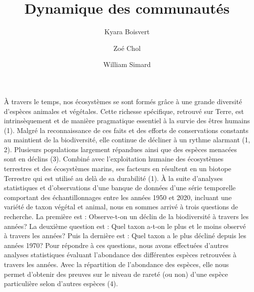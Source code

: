 \documentclass[9pt,twocolumn,twoside,]{pnas-new}
\title{Dynamique des communautés}
\author[a]{Kyara Boisvert}
\author[a]{Zoé Chol}
\author[a]{William Simard}
\affil[a]{Université de Sherbrooke, Département d'écologie, 2500
Boulevard de l'Université, Sherbrooke, Québec, J1N 3C6}
\begin{document}
\verticaladjustment{-2pt}



\maketitle
\thispagestyle{firststyle}


\acknow{}

À travers le temps, nos écosystèmes se sont formés grâce à une grande
diversité d'espèces animales et végétales. Cette richesse spécifique,
retrouvé sur Terre, est intrinsèquement et de manière pragmatique
essentiel à la survie des êtres humains (1). Malgré la reconnaissance de
ces faits et des efforts de conservations constants au maintient de la
biodiversité, elle continue de décliner à un rythme alarmant (1, 2).
Plusieurs populations largement répandues ainsi que des espèces menacées
sont en déclins (3). Combiné avec l'exploitation humaine des écosystèmes
terrestres et des écosystèmes marins, ses facteurs en résultent en un
biotope Terrestre qui est utilisé au delà de sa durabilité (1). À la
suite d'analyses statistiques et d'observations d'une banque de données
d'une série temporelle comportant des échantillonnages entre les années
1950 et 2020, incluant une variété de taxon végétal et animal, nous en
sommes arrivé à trois questions de recherche. La première est :
Observe-t-on un déclin de la biodiversité à travers les années? La
deuxième question est : Quel taxon a-t-on le plus et le moins observé à
travers les années? Puis la dernière est : Quel taxon a le plus décliné
depuis les années 1970? Pour répondre à ces questions, nous avons
effectuées d'autres analyses statistiques évaluant l'abondance des
différentes espèces retrouvées à travers les années. Avec la répartition
de l'abondance des espèces, elle nous permet d'obtenir des preuves sur
le niveau de rareté (ou non) d'une espèce particulière selon d'autres
espèces (4).
\end{document}
